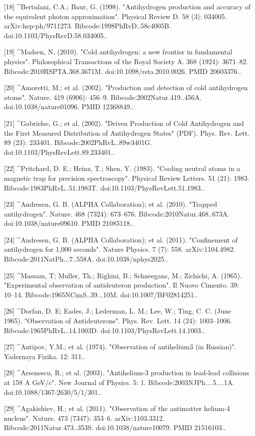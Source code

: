 [18]
^Bertulani, C.A.; Baur, G. (1998). "Antihydrogen production and accuracy of the equivalent photon approximation". Physical Review D. 58 (3): 034005. arXiv:hep-ph/9711273. Bibcode:1998PhRvD..58c4005B. doi:10.1103/PhysRevD.58.034005..

[19]
^Madsen, N. (2010). "Cold antihydrogen: a new frontier in fundamental physics". Philosophical Transactions of the Royal Society A. 368 (1924): 3671–82. Bibcode:2010RSPTA.368.3671M. doi:10.1098/rsta.2010.0026. PMID 20603376..

[20]
^Amoretti, M.; et al. (2002). "Production and detection of cold antihydrogen atoms". Nature. 419 (6906): 456–9. Bibcode:2002Natur.419..456A. doi:10.1038/nature01096. PMID 12368849..

[21]
^Gabrielse, G.; et al. (2002). "Driven Production of Cold Antihydrogen and the First Measured Distribution of Antihydrogen States" (PDF). Phys. Rev. Lett. 89 (23): 233401. Bibcode:2002PhRvL..89w3401G. doi:10.1103/PhysRevLett.89.233401..

[22]
^Pritchard, D. E.; Heinz, T.; Shen, Y. (1983). "Cooling neutral atoms in a magnetic trap for precision spectroscopy". Physical Review Letters. 51 (21): 1983. Bibcode:1983PhRvL..51.1983T. doi:10.1103/PhysRevLett.51.1983..

[23]
^Andresen, G. B. (ALPHA Collaboration); et al. (2010). "Trapped antihydrogen". Nature. 468 (7324): 673–676. Bibcode:2010Natur.468..673A. doi:10.1038/nature09610. PMID 21085118..

[24]
^Andresen, G. B. (ALPHA Collaboration); et al. (2011). "Confinement of antihydrogen for 1,000 seconds". Nature Physics. 7 (7): 558. arXiv:1104.4982. Bibcode:2011NatPh...7..558A. doi:10.1038/nphys2025..

[25]
^Massam, T; Muller, Th.; Righini, B.; Schneegans, M.; Zichichi, A. (1965). "Experimental observation of antideuteron production". Il Nuovo Cimento. 39: 10–14. Bibcode:1965NCimS..39...10M. doi:10.1007/BF02814251..

[26]
^Dorfan, D. E; Eades, J.; Lederman, L. M.; Lee, W.; Ting, C. C. (June 1965). "Observation of Antideuterons". Phys. Rev. Lett. 14 (24): 1003–1006. Bibcode:1965PhRvL..14.1003D. doi:10.1103/PhysRevLett.14.1003..

[27]
^Antipov, Y.M.; et al. (1974). "Observation of antihelium3 (in Russian)". Yadernaya Fizika. 12: 311..

[28]
^Arsenescu, R.; et al. (2003). "Antihelium-3 production in lead-lead collisions at 158 A GeV/c". New Journal of Physics. 5: 1. Bibcode:2003NJPh....5....1A. doi:10.1088/1367-2630/5/1/301..

[29]
^Agakishiev, H.; et al. (2011). "Observation of the antimatter helium-4 nucleus". Nature. 473 (7347): 353–6. arXiv:1103.3312. Bibcode:2011Natur.473..353S. doi:10.1038/nature10079. PMID 21516103..